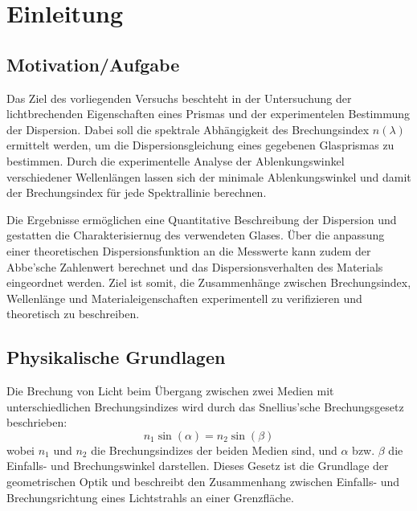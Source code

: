 \chapter{Einleitung}
\label{ch:einleitung}

\section{Motivation/Aufgabe}

Das Ziel des vorliegenden Versuchs beschteht in der Untersuchung der lichtbrechenden Eigenschaften eines Prismas und der experimentelen Bestimmung der Dispersion. Dabei soll die spektrale Abhängigkeit des Brechungsindex \( n(\lambda) \) ermittelt werden, um die Dispersionsgleichung eines gegebenen Glasprismas zu bestimmen. Durch die experimentelle Analyse der Ablenkungswinkel verschiedener Wellenlängen lassen sich der minimale Ablenkungswinkel und damit der Brechungsindex für jede Spektrallinie berechnen. 

Die Ergebnisse ermöglichen eine Quantitative Beschreibung der Dispersion und gestatten die Charakterisiernug des verwendeten Glases. Über die anpassung einer theoretischen Dispersionsfunktion an die Messwerte kann zudem der Abbe'sche Zahlenwert berechnet und das Dispersionsverhalten des Materials eingeordnet werden. Ziel ist somit, die Zusammenhänge zwischen Brechungsindex, Wellenlänge und Materialeigenschaften experimentell zu verifizieren und theoretisch zu beschreiben.

\section{Physikalische Grundlagen}
\cite{skript25}
Die Brechung von Licht beim Übergang zwischen zwei Medien mit unterschiedlichen Brechungsindizes wird durch das Snellius'sche Brechungsgesetz beschrieben:
\begin{equation}
n_1 \sin(\alpha) = n_2 \sin(\beta)
\label{eq:snellius}
\end{equation}
wobei \( n_1 \) und \( n_2 \) die Brechungsindizes der beiden Medien sind, und \(\alpha\) bzw. \(\beta\) die Einfalls- und Brechungswinkel darstellen. Dieses Gesetz ist die Grundlage der geometrischen Optik und beschreibt den Zusammenhang zwischen Einfalls- und Brechungsrichtung eines Lichtstrahls an einer Grenzfläche.

